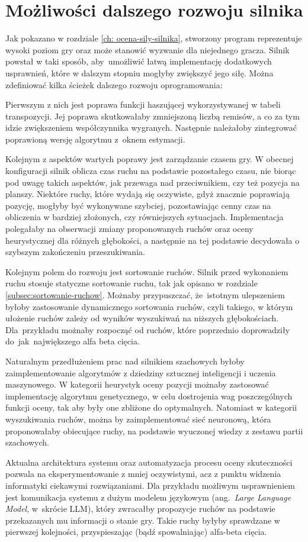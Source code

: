 \section {Możliwości dalszego rozwoju silnika}
\label {sec: dalszy-rozwoj}

Jak pokazano w rozdziale \ref{ch: ocena-sily-silnika}, stworzony program reprezentuje wysoki poziom gry oraz może stanowić wyzwanie dla niejednego gracza.
Silnik powstał w taki sposób, aby~umożliwić łatwą implementację dodatkowych usprawnień, które w dalszym stopniu mogłyby zwiększyć jego siłę.
Można zdefiniować kilka ścieżek dalszego rozwoju oprogramowania:

Pierwszym z nich jest poprawa funkcji haszującej wykorzystywanej w tabeli transpozycji.
Jej poprawa skutkowałaby zmniejszoną liczbą remisów, a co za tym idzie zwiększeniem współczynnika wygranych.
Następnie należałoby zintegrować poprawioną wersję algorytmu z~oknem estymacji.

Kolejnym z aspektów wartych poprawy jest zarządzanie czasem gry.
W obecnej konfiguracji silnik oblicza czas ruchu na podstawie pozostałego czasu, nie biorąc pod uwagę takich aspektów, jak przewaga nad przeciwnikiem, czy też pozycja na planszy.
Niektóre ruchy, które wydają się oczywiste, gdyż znacznie poprawiają pozycję, mogłyby być wykonywane szybciej, pozostawiając cenny czas na obliczenia w bardziej złożonych, czy równiejszych sytuacjach.
Implementacja polegałaby na obserwacji zmiany proponowanych ruchów oraz oceny heurystycznej dla różnych głębokości, a następnie na tej podstawie decydowała o szybszym zakończeniu przeszukiwania.

Kolejnym polem do rozwoju jest sortowanie ruchów.
Silnik przed wykonaniem ruchu stosuje statyczne sortowanie ruchu, tak jak opisano w rozdziale \ref {subsec:sortowanie-ruchow}.
Możnaby przypuszczać, że~istotnym ulepszeniem byłoby zastosowanie dynamicznego sortowania ruchów, czyli takiego, w którym ułożenie ruchów zależy od wyników wyszukiwań na niższych głębokościach.
Dla~przykładu możnaby rozpocząć od ruchów, które poprzednio doprowadziły do~jak~największego alfa beta cięcia.

Naturalnym przedłużeniem prac nad silnikiem szachowych byłoby zaimplementowanie algorytmów z dziedziny sztucznej inteligencji i uczenia maszynowego.
W kategorii heurystyk oceny pozycji możnaby zastosować implementację algorytmu genetycznego, w celu dostrojenia wag poszczególnych funkcji oceny, tak aby były one zbliżone do optymalnych.
Natomiast w kategorii wyszukiwania ruchów, można by zaimplementować sieć neuronową, która proponowałaby obiecujące ruchy, na podstawie wyuczonej wiedzy z zestawu partii szachowych.

Aktualna architektura systemu oraz automatyzacja procesu oceny skuteczności pozwala na eksperymentowanie z mniej oczywistymi, acz z punktu widzenia informatyki ciekawymi rozwiązaniami.
Dla przykładu możliwym usprawnieniem jest komunikacja systemu z dużym modelem językowym (ang.~\emph{Large Language Model}, w~skrócie LLM), który zwracałby propozycje ruchów na podstawie przekazanych mu informacji o stanie gry.
Takie ruchy byłyby sprawdzane w pierwszej kolejności, przyspieszając (bądź spowalniając) alfa-beta cięcia.



